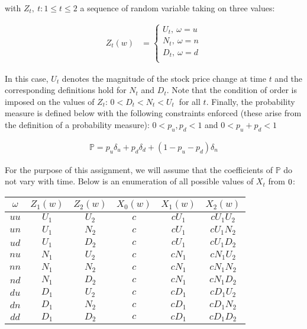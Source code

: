 \documentclass{article}
\begin{document}
with $Z_t,\medspace t:1\le t\le 2$ a sequence of random variable taking on three values: 

\begin{align*}
Z_t(w) &= \begin{cases}
    U_t, \medspace \omega=u \\
    N_t, \medspace \omega=n \\
    D_t, \medspace \omega=d \\
\end{cases}
\end{align*}

In this case, $U_t$ denotes the magnitude of the stock price change at time $t$ and the corresponding definitions hold for $N_t$ and $D_t$. Note that the condition of order is imposed on the values of $Z_t$: $0<D_t<N_t<U_t\medspace$ for all $t$. Finally, the probability measure is defined below with the following constraints enforced (these arise from the definition of a probability measure): $0<p_u,p_d<1$ and $0<p_u+p_d<1$

\begin{align*}
    \mathbb{P} = p_u\delta_u + p_d\delta_d + (1-p_u-p_d)\delta_n
\end{align*}

For the purpose of this assignment, we will assume that the coefficients of $\mathbb{P}$ do not vary with time. Below is an enumeration of all possible values of $X_t$ from $0\let\le2$:

\begin{center}
\begin{tabular}{|c|c|c|c|c|c|}
\hline 
$\omega$ & $Z_1(w)$ & $Z_2(w)$ & $X_0(w)$ & $X_1(w)$ & $X_2(w)$ \\
\hline 
\hline 
$uu$ & $U_1$ & $U_2$ & $c$ & $cU_1$ & $cU_1U_2$ \\\hline
$un$ & $U_1$ & $N_2$ & $c$ & $cU_1$ & $cU_1N_2$ \\\hline
$ud$ & $U_1$ & $D_2$ & $c$ & $cU_1$ & $cU_1D_2$ \\\hline
$nu$ & $N_1$ & $U_2$ & $c$ & $cN_1$ & $cN_1U_2$ \\\hline
$nn$ & $N_1$ & $N_2$ & $c$ & $cN_1$ & $cN_1N_2$ \\\hline
$nd$ & $N_1$ & $D_2$ & $c$ & $cN_1$ & $cN_1D_2$ \\\hline
$du$ & $D_1$ & $U_2$ & $c$ & $cD_1$ & $cD_1U_2$ \\\hline
$dn$ & $D_1$ & $N_2$ & $c$ & $cD_1$ & $cD_1N_2$ \\\hline
$dd$ & $D_1$ & $D_2$ & $c$ & $cD_1$ & $cD_1D_2$ \\\hline
\end{tabular}
\end{center}
\end{document}
